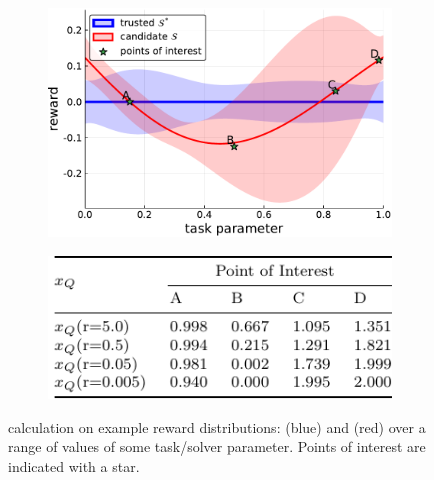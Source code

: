\begin{figure}[tbp]
    \centering
    \begin{subfigure}[c]{0.65\linewidth}
        \centering
        \includegraphics[width=0.9\linewidth]{Figures/p1.pdf}
        \vfill
        \label{fig:roadnet}
    \end{subfigure}%
    \hfill
    \begin{subfigure}[t]{0.35\linewidth}
        \centering
        \includegraphics[width=1.0\linewidth]{Figures/p1_table.pdf}
        \label{fig:med_roadnet}
    \end{subfigure} 
    \caption{\xQ{} calculation on example reward distributions: \solvestar{} (blue) and \solve{} (red) over a range of values of some task/solver parameter. Points of interest are indicated with a star.}
\end{figure}
